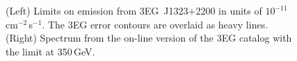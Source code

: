 \begin{figure}[b]
\caption{\label{FIG::OBSERVATIONS::J1323} (Left) Limits on 
emission from 3EG~J1323$+$2200 in units of
$10^{-11}$\,cm$^{-2}$\,s$^{-1}$. The 3EG error contours are overlaid
as heavy lines. (Right) Spectrum from the on-line version of the 3EG
catalog with the limit at 350\,GeV.}
\end{figure}

